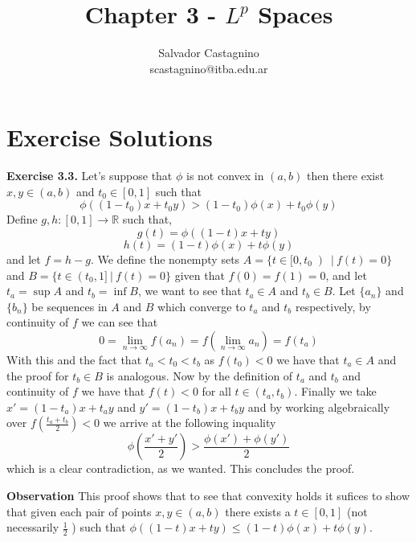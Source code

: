 \documentclass{article}
\author{Salvador Castagnino \\ scastagnino@itba.edu.ar}
\date{}
\title{Chapter 3 - $L^p$ Spaces}
\begin{document}
\maketitle

\section*{Exercise Solutions}

\begin{exercise}\textbf{Exercise 3.3.}
    Let's suppose that $\phi$ is not convex in $ \left( a,b \right)   $ then there exist $x,y \in \left( a,b \right) $ and $t_0 \in [0,1]$ such that
    \[
       \phi \left( \left( 1-t_0 \right) x + t_0 y \right) > \left( 1-t_0 \right) \phi \left( x \right) + t_0 \phi \left( y \right)  
    \]
    Define $g,h:[0,1] \rightarrow \mathbb{R}$ such that,
    \[
       g \left( t \right) = \phi \left( \left( 1-t \right) x + t y \right)
    \]
    \[
       h \left( t \right) = \left( 1-t \right) \phi \left( x \right) + t \phi \left( y \right)  
    \]
    and let $f = h - g$. We define the nonempty sets $A = \{t \in [0,t_0\left)\ |\ f(t)=0\}$ and $B = \{t \in \left(t_0, 1]\ |\ f(t)=0\}$ given that $f \left( 0 \right) = f \left( 1 \right) = 0$, and let $t_a = \sup A$ and $t_b = \inf B$, we want to see that $t_a \in A$  and $t_b \in B$. Let $\{a_n\}$ and $\{b_n\}$ be sequences in $A$ and $B$ which converge to $t_a$ and $t_b$ respectively, by continuity of $f$ we can see that
    \[
        0 = \lim_{n \to \infty} f \left( a_n \right) = f \left( \lim_{n \to \infty} a_n \right) = f \left( t_a \right) 
    \]
    With this and the fact that $t_a < t_0 < t_b$ as $f \left( t_0 \right) < 0$ we have that $t_a \in A$ and the proof for $t_b \in B$ is analogous. Now by the definition of $t_a$ and $t_b$ and continuity of $f$ we have that $f \left( t \right) < 0$ for all $t \in \left( t_a,t_b \right)$. Finally we take $x'= \left( 1-t_a \right) x+t_ay$ and $y' = \left( 1-t_b \right) x+t_by$ and by working algebraically over $f \left( \frac{t_a+t_b}{2} \right) < 0$ we arrive at the following inquality
    \[
        \phi \left( \frac{x'+y'}{2} \right) > \frac{\phi \left( x' \right) + \phi \left( y' \right) }{2}
    \]
    which is a clear contradiction, as we wanted. This concludes the proof.

    
\end{exercise}

\bigbreak

\begin{observation}\textbf{Observation}
    This proof shows that to see that convexity holds it sufices to show that given each pair of points $x,y \in \left( a,b \right) $ there exists a $t \in [0,1]$ (not necessarily $\frac{1}{2}$ ) such that $\phi \left( \left( 1-t \right) x + t y \right) \le  \left( 1-t \right) \phi \left( x \right) + t \phi \left( y \right)$. 
\end{observation}
\end{document}
